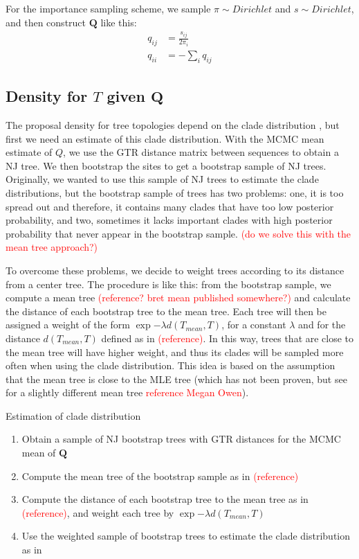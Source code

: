 \documentclass[conference]{IEEEtran}
\newcommand{\falta}[1]{\textcolor{red}{#1}}
\begin{document}
For the importance sampling scheme, we sample $\pi\sim Dirichlet$ and
$s\sim Dirichlet$, and then construct $\mathbf{Q}$ like this:
\begin{align*}
q_{ij} &= \frac{s_{ij}}{2\pi_i} \\
q_{ii} &= -\sum_i q_{ij}
\end{align*}


\subsection*{Density for $T$ given $\mathbf{Q}$}
The proposal density for tree topologies depend on the clade
distribution \citep{Larget2013}, but first we need an estimate of this
clade distribution. With the MCMC mean estimate of $Q$, we use the GTR
distance matrix between sequences to obtain a NJ tree. We then
bootstrap the sites to get a bootstrap sample of NJ trees. Originally,
we wanted to use this sample of NJ trees to estimate the clade
distributions, but the bootstrap sample of trees has two problems:
one, it is too spread out and therefore, it contains many clades that
have too low posterior probability, and two, sometimes it lacks
important clades with high posterior probability that never appear in
the bootstrap sample. \falta{(do we solve this with the mean tree
  approach?)}

To overcome these problems, we decide to weight trees according to its
distance from a center tree. The procedure is like this: from the
bootstrap sample, we compute a mean tree \falta{(reference? bret mean
  published somewhere?)} and calculate the distance of each bootstrap
tree to the mean tree. Each tree will then be assigned a weight of the
form $\exp{-\lambda d(T_{mean},T)}$, for a constant $\lambda$ and for
the distance $d(T_{mean},T)$ defined as in \falta{(reference)}. In
this way, trees that are close to the mean tree will have higher
weight, and thus its clades will be sampled more often when using the
clade distribution. This idea is based on the assumption that the mean
tree is close to the MLE tree (which has not been proven, but see for
a slightly different mean tree \falta{reference Megan Owen}).

\begin{algorithm}
\caption{Estimation of clade distribution}
\begin{enumerate}
\item{Obtain a sample of NJ bootstrap trees with GTR distances for the
    MCMC mean of $\mathbf{Q}$}
\item{Compute the mean tree of the bootstrap sample as in
    \falta{(reference)}}
\item{Compute the distance of each bootstrap tree to the mean tree as
    in \falta{(reference)}, and weight each tree by $\exp{-\lambda
      d(T_{mean},T)}$}
\item{Use the weighted sample of bootstrap trees to estimate the clade
    distribution as in \citep{Larget2013}}
\end{enumerate}
\end{algorithm}
\end{document}
